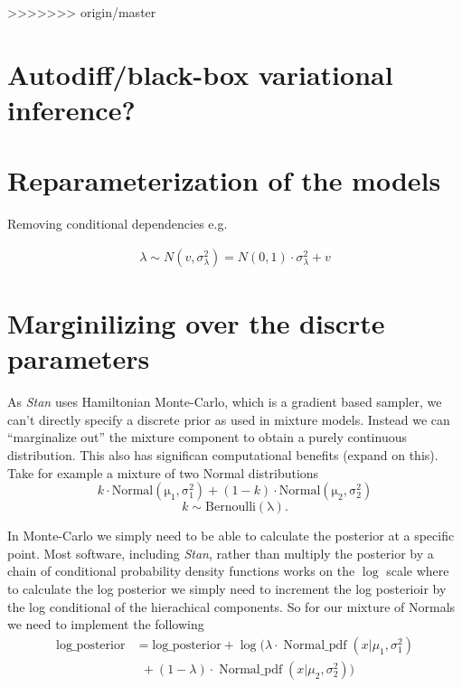 \documentclass[11pt]{report}
\begin{document}
>>>>>>> origin/master
\section{Autodiff/black-box variational inference?}

\section{Reparameterization of the models}

Removing conditional dependencies e.g.

\begin{align*}
\lambda \sim N(v, \sigma^2_\lambda) = N(0, 1) \cdot \sigma_\lambda^2 + v
\end{align*}

\section{Marginilizing over the discrte parameters}

As \emph{Stan} uses Hamiltonian Monte-Carlo, which is a gradient based sampler, we can't directly specify a discrete prior as used in mixture models. Instead we can ``marginalize out'' the mixture component to obtain a purely continuous distribution. This also has significan computational benefits (expand on this). \\

Take for example a mixture of two Normal distributions
\begin{equation}
  k \cdot \operatorname{Normal(\mu_1, \sigma_1^2)} + (1 - k) \cdot \operatorname{Normal(\mu_2, \sigma_2^2)}
\end{equation} 
\begin{equation}
  k \sim \operatorname{Bernoulli(\lambda)}.
\end{equation}

In Monte-Carlo we simply need to be able to calculate the posterior at a specific point. Most software, including \emph{Stan}, rather than multiply the posterior by a chain of conditional probability density functions works on the $\log$ scale where to calculate the log posterior we simply need to increment the log posterioir by the log conditional of the hierachical components. So for our mixture of Normals we need to implement the following
\begin{align}
  \text{log\_posterior} &= \text{log\_posterior} + \log(\lambda \cdot \operatorname{Normal\_pdf}(x | \mu_1, \sigma_1^2)  \nonumber \\
                   & \ \ + (1 - \lambda) \cdot \operatorname{Normal\_pdf}(x | \mu_2, \sigma_2^2))
\end{align}
\end{document}

